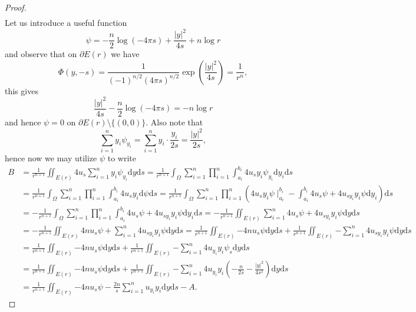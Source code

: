 \begin{proof}
$$\begin{aligned}
\end{aligned}
$$
Let us introduce a useful function 
$$
\psi =-\frac{n}{2}\log \left( -4\pi s \right) +\frac{\left| y \right|^2}{4s}+n\log r
$$
and observe that on $\partial E(r)$ we have 
$$
\Phi \left( y,-s \right) =\frac{1}{\left( -1 \right) ^{n/2}\left( 4\pi s \right) ^{n/2}}\exp \left( \frac{\left| y \right|^2}{4s} \right) =\frac{1}{r^n},
$$
this gives 
$$
\frac{\left| y \right|^2}{4s}-\frac{n}{2}\log \left( -4\pi s \right) =-n\log r
$$
and hence $\psi=0$ on $\partial E(r)\setminus\{(0,0)\}$. Also note that 
$$
\sum_{i=1}^n{y_i\psi _{y_i}}=\sum_{i=1}^n{y_i\cdot \frac{y_i}{2s}}=\frac{\left| y \right|^2}{2s},
$$
hence now we may utilize $\psi$ to write 
$$
\begin{aligned}
B&=\frac{1}{r^{n+1}}\iint_{E\left( r \right)}{4u_s\sum_{i=1}^n{y_i\psi _{y_i}}\mathrm{d}y\mathrm{d}s}=\frac{1}{r^{n+1}}\int_{\Omega}{\sum_{i=1}^n{\prod_{i=1}^n{\int_{a_i}^{b_i}{4u_sy_i\psi _{y_i}\mathrm{d}y_i}}}\mathrm{d}s}
\\
&=\frac{1}{r^{n+1}}\int_{\Omega}{\sum_{i=1}^n{\prod_{i=1}^n{\int_{a_i}^{b_i}{4u_sy_i\mathrm{d}\psi}}}\mathrm{d}s}=\frac{1}{r^{n+1}}\int_{\Omega}{\sum_{i=1}^n{\prod_{i=1}^n{\left( 4u_sy_i\psi \mid_{a_i}^{b_i}-\int_{a_i}^{b_i}{4u_s\psi +4u_{sy_i}y_i\psi \mathrm{d}y_i} \right)}}\mathrm{d}s}
\\
&=-\frac{1}{r^{n+1}}\int_{\Omega}{\sum_{i=1}^n{\prod_{i=1}^n{\int_{a_i}^{b_i}{4u_s\psi +4u_{sy_i}y_i\psi \mathrm{d}y_i}}}\mathrm{d}s}=-\frac{1}{r^{n+1}}\iint_{E\left( r \right)}{\sum_{i=1}^n{4u_s\psi +4u_{sy_i}y_i\psi}\mathrm{d}y\mathrm{d}s}
\\
&=-\frac{1}{r^{n+1}}\iint_{E\left( r \right)}{4nu_s\psi +\sum_{i=1}^n{4u_{sy_i}y_i\psi}\mathrm{d}y\mathrm{d}s}=\frac{1}{r^{n+1}}\iint_{E\left( r \right)}{-4nu_s\psi \mathrm{d}y\mathrm{d}s}+\frac{1}{r^{n+1}}\iint_{E\left( r \right)}{-\sum_{i=1}^n{4u_{sy_i}y_i\psi}\mathrm{d}y\mathrm{d}s}
\\
&=\frac{1}{r^{n+1}}\iint_{E\left( r \right)}{-4nu_s\psi \mathrm{d}y\mathrm{d}s}+\frac{1}{r^{n+1}}\iint_{E\left( r \right)}{-\sum_{i=1}^n{4u_{y_i}y_i\psi _s}\mathrm{d}y\mathrm{d}s}
\\
&=\frac{1}{r^{n+1}}\iint_{E\left( r \right)}{-4nu_s\psi \mathrm{d}y\mathrm{d}s}+\frac{1}{r^{n+1}}\iint_{E\left( r \right)}{-\sum_{i=1}^n{4u_{y_i}y_i\left( -\frac{n}{2s}-\frac{\left| y \right|^2}{4s^2} \right)}\mathrm{d}y\mathrm{d}s}
\\
&=\frac{1}{r^{n+1}}\iint_{E\left( r \right)}{-4nu_s\psi -\frac{2n}{s}\sum_{i=1}^n{u_{y_i}y_i}\mathrm{d}y\mathrm{d}s}-A.
\end{aligned}
$$
\end{proof}
